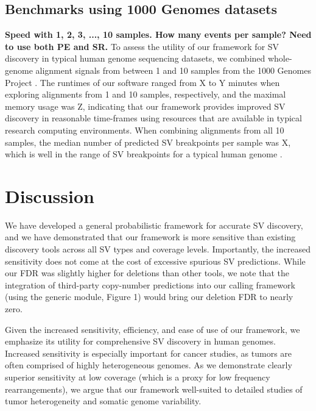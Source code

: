 \documentclass[11pt]{article}
\begin{document}
\subsection{Benchmarks using 1000 Genomes datasets}
\textbf{Speed with 1, 2, 3, ..., 10 samples.  How many events per sample?
Need to use both PE and SR.}
To assess the utility of our framework for SV discovery in typical human genome
sequencing datasets, we combined whole-genome alignment signals from between 1 
and 10 samples from the 1000 Genomes Project \cite{durbin2010}. The runtimes
of our software ranged from X to Y minutes when exploring alignments from 1 and
10 samples, respectively, and the maximal memory usage was Z, indicating that
our framework provides improved SV discovery in reasonable time-frames using
resources that are available in typical research computing environments. When
combining alignments from all 10 samples, the median number of predicted SV
breakpoints per sample was X, which is well in the range of SV 
breakpoints for a typical human genome \cite{mills2011}.


\section{Discussion}
We have developed a general probabilistic framework for accurate SV discovery, 
and we have demonstrated that our framework is more sensitive than existing 
discovery tools across all SV types and coverage levels. Importantly, the
increased sensitivity does not come at the cost of excessive spurious SV
predictions. While our FDR was slightly higher for deletions than other tools,
we note that the integration of third-party copy-number predictions into
our calling framework (using the generic module, Figure 1) would bring our 
deletion FDR to nearly zero.

Given the increased sensitivity, efficiency, and ease of use of our framework, 
we emphasize its utility for comprehensive SV discovery in human genomes. 
Increased sensitivity is especially important for cancer studies, as tumors are 
often comprised of highly heterogeneous genomes. As we demonstrate clearly
superior sensitivity at low coverage (which is a proxy for low frequency 
rearrangements), we argue that our framework well-suited to detailed studies
	of tumor heterogeneity and somatic genome variability.\\
\end{document}

